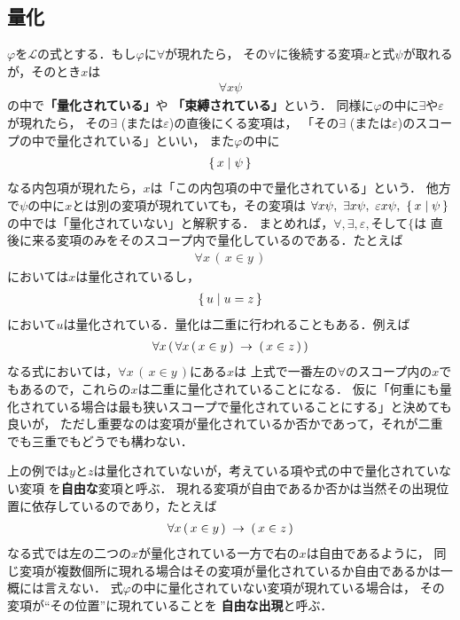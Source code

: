 \subsection{量化}
	$\varphi$を$\mathcal{L}$の式とする．もし$\varphi$に$\forall$が現れたら，
	その$\forall$に後続する変項$x$と式$\psi$が取れるが，そのとき$x$は
	\begin{align}
		\forall x \psi
	\end{align}
	の中で{\bf 「量化されている」}や
	{\bf 「束縛されている」}という．
	同様に$\varphi$の中に$\exists$や$\varepsilon$が現れたら，
	その$\exists$ (または$\varepsilon$)の直後にくる変項は，
	「その$\exists$ (または$\varepsilon$)のスコープの中で量化されている」といい，
	また$\varphi$の中に
	\begin{align}
		\{\, x \mid \psi\, \}
	\end{align}
	なる内包項が現れたら，$x$は「この内包項の中で量化されている」という．
	他方で$\psi$の中に$x$とは別の変項が現れていても，その変項は
	$\forall x \psi,\ \exists x \psi,\ \varepsilon x \psi,\ \{\, x \mid \psi\, \}$
	の中では「量化されていない」と解釈する．
	まとめれば，$\forall,\exists,\varepsilon,$そして$\{$は
	直後に来る変項のみをそのスコープ内で量化しているのである．たとえば
	\begin{align}
		\forall x\, (\, x \in y\, )
	\end{align}
	においては$x$は量化されているし，
	\begin{align}
		\{\, u \mid u = z\, \}
	\end{align}
	において$u$は量化されている．量化は二重に行われることもある．例えば
	\begin{align}
		\forall x\, (\, \forall x\, (\, x \in y\, ) \hspace{0.25em}\rightarrow\hspace{0.25em} (\, x \in z\, )\, )
	\end{align}
	なる式においては，$\forall x\, (\, x \in y\, )$にある$x$は
	上式で一番左の$\forall$のスコープ内の$x$でもあるので，これらの$x$は二重に量化されていることになる．
	仮に「何重にも量化されている場合は最も狭いスコープで量化されていることにする」と決めても良いが，
	ただし重要なのは変項が量化されているか否かであって，それが二重でも三重でもどうでも構わない．
	
	上の例では$y$と$z$は量化されていないが，考えている項や式の中で量化されていない変項
	を{\bf 自由な}変項と呼ぶ．
	現れる変項が自由であるか否かは当然その出現位置に依存しているのであり，たとえば
	\begin{align}
		\forall x\, (\, x \in y\, ) \hspace{0.25em}\rightarrow\hspace{0.25em} (\, x \in z\, )
	\end{align}
	なる式では左の二つの$x$が量化されている一方で右の$x$は自由であるように，
	同じ変項が複数個所に現れる場合はその変項が量化されているか自由であるかは一概には言えない．
	式$\varphi$の中に量化されていない変項が現れている場合は，
	その変項が``その位置''に現れていることを
	{\bf 自由な出現}と呼ぶ．
	
